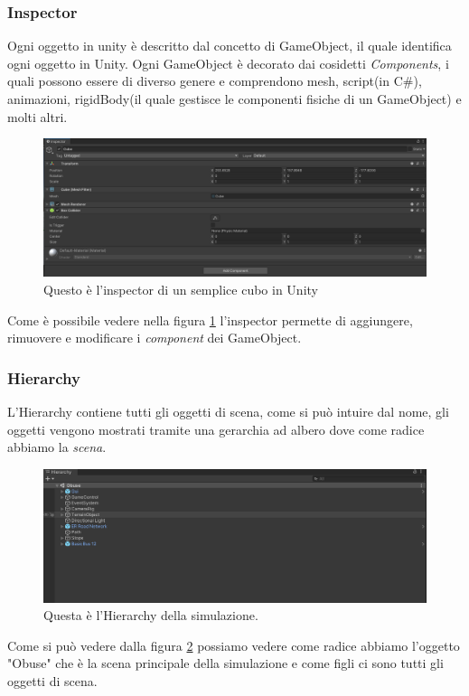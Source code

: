 \documentclass[12pt, openany]{book}
\begin{document}
	\subsubsection{Inspector}
	Ogni oggetto in unity è descritto dal concetto di GameObject, il quale identifica ogni oggetto in Unity. Ogni GameObject è decorato dai cosidetti \emph{Components}, i quali possono essere di diverso genere e comprendono mesh, script(in C\#), animazioni, rigidBody(il quale gestisce le componenti fisiche di un GameObject) e molti altri.
	\begin{figure}[H]
		\centering
		\includegraphics[width=1\linewidth]{"Immagini/Inspector"}
		\caption{Questo è l'inspector di un semplice cubo in Unity}
		\label{fig:Inspector}
	\end{figure}

	Come è possibile vedere nella figura \ref{fig:Inspector} l'inspector permette di aggiungere, rimuovere e modificare i \emph{component} dei GameObject.
	\subsubsection{Hierarchy}
	L'Hierarchy contiene tutti gli oggetti di scena, come si può intuire dal nome, gli oggetti vengono mostrati tramite una gerarchia ad albero dove come radice abbiamo la \emph{scena}.
	\begin{figure}[H]
		\centering
		\includegraphics[width=1\linewidth]{"Immagini/Hierarchy"}
		\caption{Questa è l'Hierarchy della simulazione.}
		\label{fig:Hierarchy}
	\end{figure}
	Come si può vedere dalla figura \ref{fig:Hierarchy} possiamo vedere come radice abbiamo l'oggetto "Obuse" che è la scena principale della simulazione e come figli ci sono tutti gli oggetti di scena.
\end{document}
